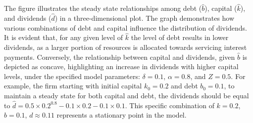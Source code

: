 \documentclass[12pt]{report}
\begin{document}
The figure illustrates the steady state relationships among debt (\(\widehat{b}\)), capital (\(\widehat{k}\)), and
dividends  (\(\widehat{d}\)) in a three-dimensional plot. The graph demonstrates how various combinations of debt and
capital influence the distribution of dividends. It is evident that, for any given level of \(\hat{k}\) the level of debt results in lower
dividends, as a larger portion of resources is allocated towards servicing interest payments. Conversely, the
relationship between capital and dividends, given \(\hat{b}\) is depicted as concave, highlighting an increase in dividends with higher
capital levels, under the specified model parameters: \(\delta = 0.1\), \(\alpha = 0.8\), and \(Z = 0.5\).
For example, the firm starting with initial capital \(k_0 = 0.2\) and debt \(b_0 = 0.1\), to maintain a steady state for both
capital and  debt, the dividends should be equal to \(\widehat{d} = 0.5 \times 0.2^{0.8} - 0.1 \times 0.2 - 0.1
\times 0.1\). This specific combination of \(k= 0.2\), \(b = 0.1\), \(d \approx 0.11 \) represents a stationary point in the model.
\vspace{1cm}
\end{document}
